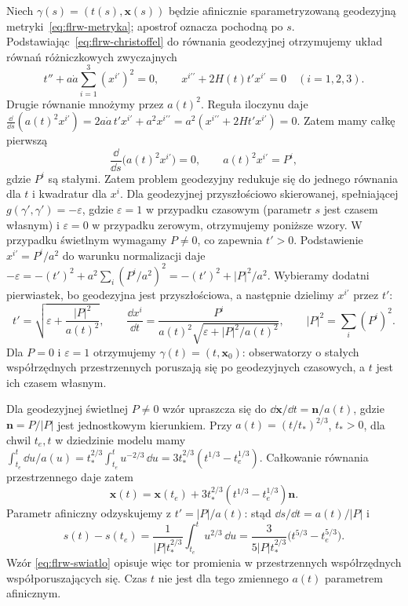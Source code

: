 \begin{przyklad}
\label{prz:flrw-geodezyjne}
Niech $\gamma(s)=(t(s),\mathbf x(s))$ będzie afinicznie
sparametryzowaną geodezyjną metryki~\eqref{eq:flrw-metryka};
apostrof oznacza pochodną po $s$.
Podstawiając~\eqref{eq:flrw-christoffel} do równania geodezyjnej
otrzymujemy układ równań różniczkowych zwyczajnych
\begin{equation}\label{eq:flrw-ode-geodezyjnych}
 t''+a\dot a\sum_{i=1}^3(x^{i\prime})^2=0,\qquad
 x^{i\prime\prime}+2H(t)t'x^{i\prime}=0
 \quad(i=1,2,3).
\end{equation}
Drugie równanie mnożymy przez $a(t)^2$.
Reguła iloczynu daje
$\frac{\dd}{\dd s}(a(t)^2x^{i\prime})
=2a\dot a\,t'x^{i\prime}+a^2x^{i\prime\prime}
=a^2(x^{i\prime\prime}+2Ht'x^{i\prime})=0$.
Zatem mamy całkę pierwszą
\begin{equation}\label{eq:flrw-momenty}
 \frac{\dd}{\dd s}\bigl(a(t)^2x^{i\prime}\bigr)=0,
 \qquad a(t)^2x^{i\prime}=P^i,
\end{equation}
gdzie $P^i$ są stałymi. Zatem problem geodezyjny
redukuje się do jednego równania dla $t$ i kwadratur dla $x^i$.
Dla geodezyjnej przyszłościowo skierowanej, spełniającej
$g(\gamma',\gamma')=-\varepsilon$,
gdzie $\varepsilon=1$ w przypadku czasowym (parametr $s$ jest
czasem własnym) i $\varepsilon=0$ w przypadku zerowym,
otrzymujemy poniższe wzory. W przypadku świetlnym
wymagamy $P\ne0$, co zapewnia $t'>0$.
Podstawienie $x^{i\prime}=P^i/a^2$ do warunku
normalizacji daje
$-\varepsilon=-(t')^2+a^2\sum_i(P^i/a^2)^2
=-(t')^2+|P|^2/a^2$.
Wybieramy dodatni pierwiastek, bo geodezyjna jest
przyszłościowa, a następnie dzielimy $x^{i\prime}$
przez $t'$:
\begin{equation}\label{eq:flrw-pierwsza-calka}
 t'=\sqrt{\varepsilon+\frac{|P|^2}{a(t)^2}},\qquad
 \frac{\dd x^i}{\dd t}
 =\frac{P^i}{a(t)^2\sqrt{\varepsilon+|P|^2/a(t)^2}},
 \qquad |P|^2=\sum_i(P^i)^2.
\end{equation}
Dla $P=0$ i $\varepsilon=1$ otrzymujemy
$\gamma(t)=(t,\mathbf x_0)$: obserwatorzy o stałych
współrzędnych przestrzennych poruszają się po geodezyjnych
czasowych, a $t$ jest ich czasem własnym.

Dla geodezyjnej świetlnej $P\ne0$ wzór upraszcza się do
$\dd\mathbf x/\dd t=\mathbf n/a(t)$,
gdzie $\mathbf n=P/|P|$ jest jednostkowym kierunkiem.
Przy $a(t)=(t/t_*)^{2/3}$, $t_*>0$, dla chwil
$t_e,t$ w dziedzinie modelu mamy
$\int_{t_e}^t\dd u/a(u)
=t_*^{2/3}\int_{t_e}^t u^{-2/3}\,\dd u
=3t_*^{2/3}(t^{1/3}-t_e^{1/3})$.
Całkowanie równania przestrzennego daje zatem
\begin{equation}\label{eq:flrw-swiatlo}
 \mathbf x(t)=\mathbf x(t_e)+
 3t_*^{2/3}(t^{1/3}-t_e^{1/3})\mathbf n.
\end{equation}
Parametr afiniczny odzyskujemy z $t'=|P|/a(t)$:
stąd $\dd s/\dd t=a(t)/|P|$ i
\[
 s(t)-s(t_e)=
 \frac1{|P|t_*^{2/3}}\int_{t_e}^t u^{2/3}\,\dd u
 =
 \frac{3}{5|P|t_*^{2/3}}
       \bigl(t^{5/3}-t_e^{5/3}\bigr).
\]
Wzór \eqref{eq:flrw-swiatlo} opisuje więc tor promienia
w przestrzennych współrzędnych współporuszających się.
Czas $t$ nie jest dla tego zmiennego $a(t)$ parametrem afinicznym.
\end{przyklad}

